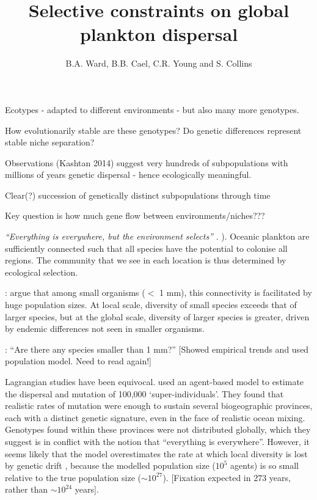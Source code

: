 \documentclass[12pt]{article}
\title{Selective constraints on global plankton dispersal}
\author{B.A. Ward, B.B. Cael, C.R. Young and S. Collins}
\date{} %
\begin{document}
 

\maketitle


Ecotypes - adapted to different environments - but also many more genotypes.

How evolutionarily stable are these genotypes? Do genetic differences represent stable niche separation?

Observations (Kashtan 2014) suggest very hundreds of subpopulations with millions of years genetic dispersal - hence ecologically meaningful.

Clear(?) succession of genetically distinct subpopulations through time

Key question is how much gene flow between environments/niches???




\textit{``Everything is everywhere, but the environment selects''} \citep{BaasBecking:1934}. \citep[Also Beijerinck: one particular species of bacteria found anywhere on Earth, provided environmental requirements are met...][]{Fenchel:2004} ). Oceanic plankton are sufficiently connected such that all species have the potential to colonise all regions. The community that we see in each location is thus determined by ecological selection. 

\citet{Fenchel:2004}: argue that among small organisms ($<$ 1 mm), this connectivity is facilitated by huge population sizes. At local scale, diversity of small species exceeds that of larger species, but at the global scale, diversity of larger species is greater, driven by endemic differences not seen in smaller organisms. 



\citet{Rossberg:2013}: ``Are there any species smaller than 1 mm?'' [Showed empirical trends and used population model. Need to read again!]


Lagrangian studies have been equivocal. \citet{Hellweger:2014} used an agent-based model to estimate the dispersal and mutation of 100,000 `super-individuals'. They found that realistic rates of mutation were enough to sustain several biogeographic provinces, each with a distinct genetic signature, even in the face of realistic ocean mixing. Genotypes found within these provinces were not distributed globally, which they suggest is in conflict with the notion that “everything is everywhere”. However, it seems likely that the model overestimates the rate at which local diversity is lost by genetic drift \citep[i.e. coalescence??][]{Kingman:1982}, because the modelled population size ($10^{5}$ agents) is so small relative to the true population size ($\sim10^{27}$). [Fixation expected in 273 years, rather than $\sim10^{24}$ years].
\end{document}
